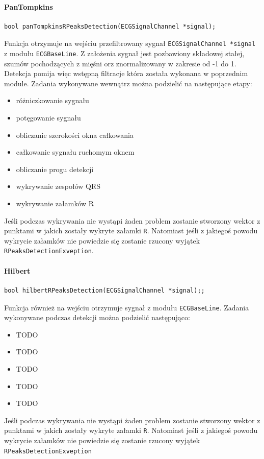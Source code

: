 \documentclass[a4paper, 11pt]{article}
\begin{document}
\paragraph{PanTompkins}
\begin{lstlisting}
bool panTompkinsRPeaksDetection(ECGSignalChannel *signal);
\end{lstlisting}
Funkcja otrzymuje na wejściu przefiltrowany sygnał \verb|ECGSignalChannel *signal| z modułu \verb|ECGBaseLine|. Z założenia sygnał jest pozbawiony składowej stałej, szumów pochodzących z mięśni orz znormalizowany w zakresie od -1 do 1. Detekcja pomija więc wstępną filtracje która została wykonana w poprzednim module. Zadania wykonywane wewnątrz można podzielić na następujące etapy:
\begin{itemize}
	\item różniczkowanie sygnału
	\item potęgowanie sygnału
	\item obliczanie szerokości okna całkowania 
	\item całkowanie sygnału ruchomym oknem
	\item obliczanie progu detekcji 
	\item wykrywanie zespołów QRS
	\item wykrywanie załamków R
\end{itemize}
Jeśli podczas wykrywania nie wystąpi żaden problem zostanie stworzony wektor z punktami w jakich zostały wykryte załamki \verb|R|. Natomiast jeśli z jakiegoś powodu wykrycie załamków nie powiedzie się zostanie rzucony wyjątek \verb|RPeaksDetectionExveption|.
\paragraph{Hilbert}
\begin{lstlisting}
bool hilbertRPeaksDetection(ECGSignalChannel *signal);;
\end{lstlisting}
Funkcja również na wejściu otrzymuje sygnał z modułu \verb|ECGBaseLine|. Zadania wykonywane podczas detekcji można podzielić następująco:
\begin{itemize}
	\item TODO
	\item TODO
	\item TODO
	\item TODO
	\item TODO
\end{itemize}
Jeśli podczas wykrywania nie wystąpi żaden problem zostanie stworzony wektor z punktami w jakich zostały wykryte załamki \verb|R|. Natomiast jeśli z jakiegoś powodu wykrycie załamków nie powiedzie się zostanie rzucony wyjątek \verb|RPeaksDetectionExveption|
\end{document}
